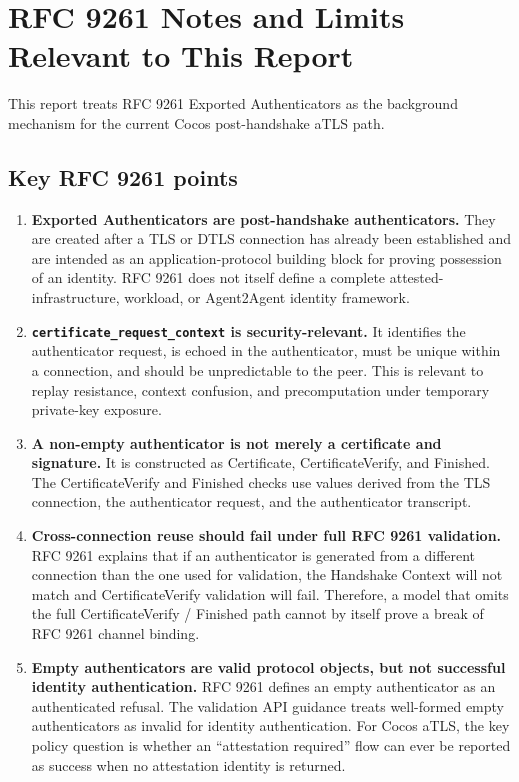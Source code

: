 \documentclass[11pt,a4paper]{article}
\begin{document}
\newpage
\section{RFC 9261 Notes and Limits Relevant to This Report}
\label{app:rfc9261-notes}

This report treats RFC 9261 Exported Authenticators as the background
mechanism for the current Cocos post-handshake aTLS path.

\subsection{Key RFC 9261 points}

\begin{enumerate}
\item \textbf{Exported Authenticators are post-handshake authenticators.}
They are created after a TLS or DTLS connection has already been established
and are intended as an application-protocol building block for proving
possession of an identity. RFC 9261 does not itself define a complete
attested-infrastructure, workload, or Agent2Agent identity framework.

\item \textbf{\texttt{certificate\_request\_context} is security-relevant.}
It identifies the authenticator request, is echoed in the authenticator, must
be unique within a connection, and should be unpredictable to the peer. This is
relevant to replay resistance, context confusion, and precomputation under
temporary private-key exposure.

\item \textbf{A non-empty authenticator is not merely a certificate and signature.}
It is constructed as Certificate, CertificateVerify, and Finished. The
CertificateVerify and Finished checks use values derived from the TLS
connection, the authenticator request, and the authenticator transcript.

\item \textbf{Cross-connection reuse should fail under full RFC 9261 validation.}
RFC 9261 explains that if an authenticator is generated from a different
connection than the one used for validation, the Handshake Context will not
match and CertificateVerify validation will fail. Therefore, a model that omits
the full CertificateVerify / Finished path cannot by itself prove a break of
RFC 9261 channel binding.

\item \textbf{Empty authenticators are valid protocol objects, but not successful identity authentication.}
RFC 9261 defines an empty authenticator as an authenticated refusal. The
validation API guidance treats well-formed empty authenticators as invalid for
identity authentication. For Cocos aTLS, the key policy question is whether an
``attestation required'' flow can ever be reported as success when no
attestation identity is returned.
\end{enumerate}
\end{document}
